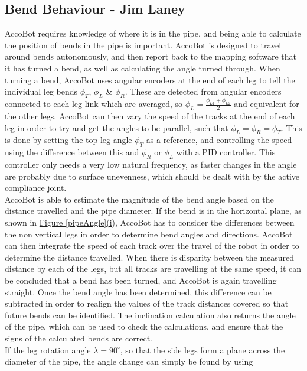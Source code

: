 \documentclass[11pt]{article}		%
\begin{document}
		\subsection[Bend Behaviour]{Bend Behaviour - Jim Laney}
		
			AccoBot requires knowledge of where it is in the pipe, and being able to calculate the position of bends in the pipe is important.
			AccoBot is designed to travel around bends autonomously, and then report back to the mapping software that it has turned a bend, as well as calculating the angle turned through.
			When turning a bend, AccoBot uses angular encoders at the end of each leg to tell the individual leg bends $\phi_T$, $\phi_L$ \& $\phi_R$.
			These are detected from angular encoders connected to each leg link which are averaged, so $\phi_L = \frac{\phi_{L1} + \phi_{L2}}{2}$ and equivalent for the other legs.
			AccoBot can then vary the speed of the tracks at the end of each leg in order to try and get the angles to be parallel, such that $\phi_L = \phi_R = \phi_T$.
			This is done by setting the top leg angle $\phi_T$ as a reference, and controlling the speed using the difference between this and $\phi_R$ or $\phi_L$ with a PID controller.
			This controller only needs a very low natural frequency, as faster changes in the angle are probably due to surface unevenness, which should be dealt with by the active compliance joint.
			\\
			AccoBot is able to estimate the magnitude of the bend angle based on the distance travelled and the pipe diameter.
			If the bend is in the horizontal plane, as shown in \hyperref[pipeAngle]{Figure \ref*{pipeAngle}(i)}, AccoBot has to consider the differences between the non vertical legs in order to determine bend angles and directions.
			AccoBot can then integrate the speed of each track over the travel of the robot in order to determine the distance travelled.
			When there is disparity between the measured distance by each of the legs, but all tracks are travelling at the same speed, it can be concluded that a bend has been turned, and AccoBot is again travelling straight.
			Once the bend angle has been determined, this difference can be subtracted in order to realign the values of the track distances covered so that future bends can be identified.
			The inclination calculation also returns the angle of the pipe, which can be used to check the calculations, and ensure that the signs of the calculated bends are correct.
			\\
			If the leg rotation angle $\lambda = 90^\circ$, so that the side legs form a plane across the diameter of the pipe, the angle change can simply be found by using
\end{document}
